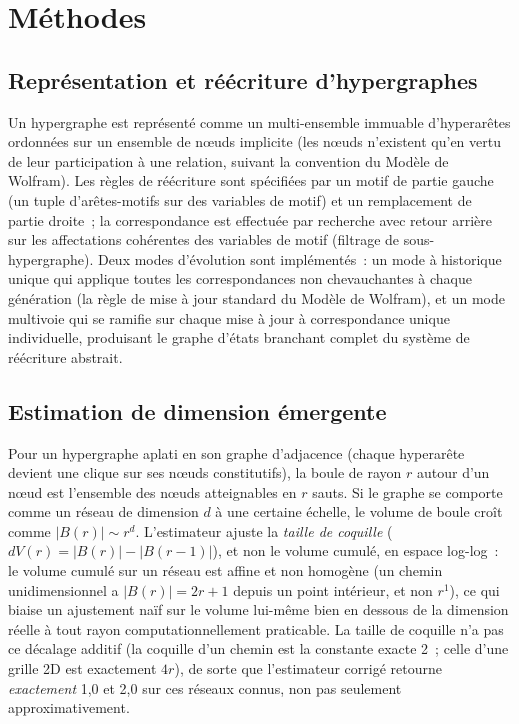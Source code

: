 \documentclass[11pt,a4paper]{article}
\begin{document}
\section{Méthodes}

\subsection{Représentation et réécriture d'hypergraphes}

Un hypergraphe est représenté comme un multi-ensemble immuable
d'hyperarêtes ordonnées sur un ensemble de nœuds implicite (les nœuds
n'existent qu'en vertu de leur participation à une relation, suivant la
convention du Modèle de Wolfram). Les règles de réécriture sont spécifiées
par un motif de partie gauche (un tuple d'arêtes-motifs sur des variables
de motif) et un remplacement de partie droite~; la correspondance est
effectuée par recherche avec retour arrière sur les affectations cohérentes
des variables de motif (filtrage de sous-hypergraphe). Deux modes
d'évolution sont implémentés~: un mode à historique unique qui applique
toutes les correspondances non chevauchantes à chaque génération (la règle
de mise à jour standard du Modèle de Wolfram), et un mode multivoie qui se
ramifie sur chaque mise à jour à correspondance unique individuelle,
produisant le graphe d'états branchant complet du système de réécriture
abstrait.

\subsection{Estimation de dimension émergente}

Pour un hypergraphe aplati en son graphe d'adjacence (chaque hyperarête
devient une clique sur ses nœuds constitutifs), la boule de rayon $r$
autour d'un nœud est l'ensemble des nœuds atteignables en $r$ sauts. Si le
graphe se comporte comme un réseau de dimension $d$ à une certaine échelle,
le volume de boule croît comme $|B(r)| \sim r^d$. L'estimateur ajuste la
\emph{taille de coquille} ($dV(r) = |B(r)| - |B(r-1)|$), et non le volume
cumulé, en espace log-log~: le volume cumulé sur un réseau est affine et
non homogène (un chemin unidimensionnel a $|B(r)| = 2r+1$ depuis un point
intérieur, et non $r^1$), ce qui biaise un ajustement naïf sur le volume
lui-même bien en dessous de la dimension réelle à tout rayon
computationnellement praticable. La taille de coquille n'a pas ce décalage
additif (la coquille d'un chemin est la constante exacte 2~; celle d'une
grille 2D est exactement $4r$), de sorte que l'estimateur corrigé retourne
\emph{exactement} 1,0 et 2,0 sur ces réseaux connus, non pas seulement
approximativement.
\end{document}
